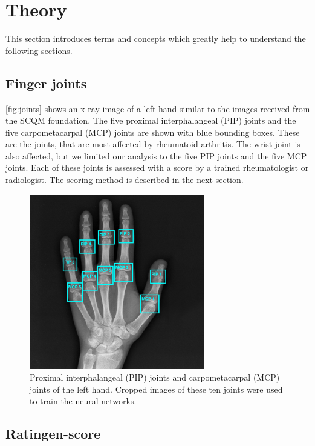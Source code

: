 \documentclass[12pt]{article}
\begin{document}
\newpage

\section{Theory}
\label{sec:theory}
This section introduces terms and concepts which greatly help to understand the following sections.

\subsection{Finger joints}
\label{subsec:joints}

\autoref{fig:joints} shows an x-ray image of a left hand similar to the images received from the SCQM foundation. The five proximal interphalangeal (PIP) joints and the five carpometacarpal (MCP) joints are shown with blue bounding boxes. These are the joints, that are most affected by rheumatoid arthritis. The wrist joint is also affected, but we limited our analysis to the five PIP joints and the five MCP joints. Each of these joints is assessed with a score by a trained rheumatologist or radiologist. The scoring method is described in the next section.

\begin{figure}[ht]
\includegraphics[width=3in]{joints}	
\caption{Proximal interphalangeal (PIP) joints and carpometacarpal  (MCP) joints of the left hand. Cropped images of these ten joints were used to train the neural networks.}
\label{fig:joints}
\end{figure}

\subsection{Ratingen-score}
\label{subsec:ratingen}
\end{document}
